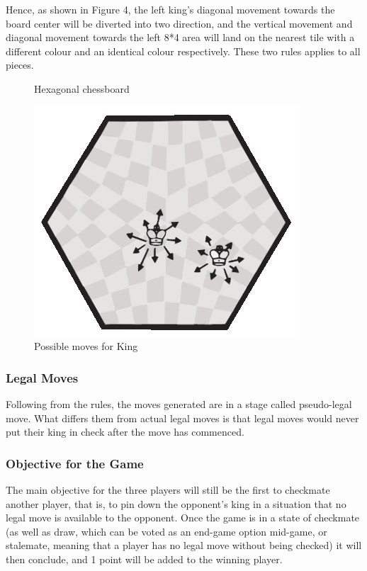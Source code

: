 \documentclass[10pt]{article}
\begin{document}
Hence, as shown in Figure 4, the left king's diagonal movement towards the board center will be diverted into two direction, and the vertical movement and diagonal movement towards the left 8*4 area will land on the nearest tile with a different colour and an identical colour respectively. These two rules applies to all pieces.

\begin{figure}
\centering
\begin{minipage}{.5\textwidth}
\centering

\caption{Hexagonal chessboard}
\label{fig:board}
\end{minipage}\hfill
\begin{minipage}{.5\textwidth}
\centering
\includegraphics[width = \linewidth]{ king_moves }
\caption{Possible moves for King}
\label{fig:moves}
\end{minipage}
\end{figure}

\subsubsection{Legal Moves}
Following from the rules, the moves generated are in a stage called pseudo-legal move. What differs them from actual legal moves is that legal moves would never put their king in check after the move has commenced.
\subsubsection{Objective for the Game}
The main objective for the three players will still be the first to checkmate another player, that is, to pin down the opponent's king in a situation that no legal move is available to the opponent. Once the game is in a state of checkmate (as well as draw, which can be voted as an end-game option mid-game, or stalemate, meaning that a player has no legal move without being checked) it will then conclude, and 1 point will be added to the winning player.
\end{document}
